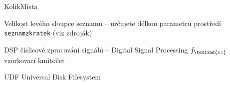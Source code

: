\begin{seznamzkratek}{KolikMista}

		{Velikost levého sloupce seznamu}								%
		{-- určujete délkou parametru prostředí \texttt{seznamzkratek} (viz zdroják)}

		{DSP}								%
		{číslicové zpracování signálů -- Digital Signal Processing}
		{\ensuremath{f_\textind{vz}}} %
		{vzorkovací kmitočet}					%

        {UDF}
        {Universal Disk Filesystem}

\end{seznamzkratek}
